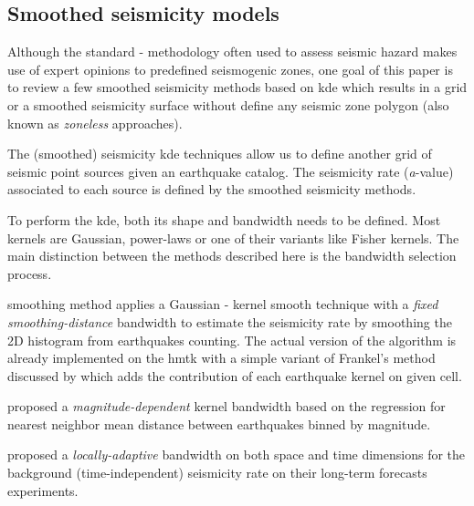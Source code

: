 \documentclass[draft, grl]{agutex}
\begin{document}
\begin{article}


\subsection{Smoothed seismicity models}

Although the standard \citet{cornell_1968}-\citet{mcguire_1976} methodology often used to assess seismic hazard makes use of expert opinions to predefined seismogenic zones, one goal of this paper is to review a few smoothed seismicity methods based on \gls{kde} which results in a grid or a smoothed seismicity surface without define any seismic zone polygon (also known as \textit{zoneless} approaches).

The (smoothed) seismicity \gls{kde} techniques allow us to define another grid of seismic point sources given an earthquake catalog. The seismicity rate (\emph{a}-value) associated to each source is defined by the smoothed seismicity methods.

To perform the \gls{kde}, both its shape and bandwidth needs to be defined. Most kernels are Gaussian, power-laws or one of their variants like Fisher kernels. The main distinction between the methods described here is the bandwidth selection process.

\citet{frankel_1995} smoothing method applies a Gaussian \citet{nadaraya_1964}-\citet{watson_1964} kernel smooth technique with a \emph{fixed smoothing-distance} bandwidth to estimate the seismicity rate by smoothing the 2D histogram from earthquakes counting. The actual version of the algorithm is already implemented on the \gls{hmtk} \citep{weatherill_2012, weatherill_2014_1} with a simple variant of Frankel's method discussed by \citet{zechar_jordan_2010} which adds the contribution of each earthquake kernel on given cell. 

\citet{woo_1996} proposed a \emph{magnitude-dependent} kernel bandwidth based on the regression for nearest neighbor mean distance between earthquakes binned by magnitude.

\citet{helmstetter_2012} proposed a \emph{locally-adaptive} bandwidth on both space and time dimensions for the background (time-independent) seismicity rate on their long-term forecasts experiments.


\end{article}
\end{document}
